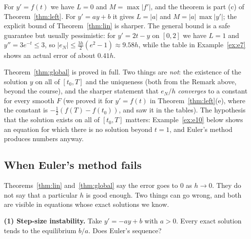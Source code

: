 \documentclass[11pt]{article}
\begin{document}
For $y'=f(t)$ we have $L=0$ and $M=\max\lvert f'\rvert$, and the theorem is part (c) of Theorem~\ref{thm:left}. For $y'=ay+b$ it gives $L=\lvert a\rvert$ and $M=\lvert a\rvert\,\max\lvert y'\rvert$; the explicit bound of Theorem~\ref{thm:lin} is sharper. The general bound is a safe guarantee but usually pessimistic: for $y'=2t-y$ on $[0,2]$ we have $L=1$ and $y''=3e^{-t}\le3$, so $\lvert e_N\rvert\le\frac{3h}{2}(e^{2}-1)\approx9.58h$, while the table in Example~\ref{ex:e7} shows an actual error of about $0.41h$.

\begin{remark}
Theorem~\ref{thm:global} is proved in full. Two things are \emph{not}: the existence of the solution $y$ on all of $[t_0,T]$ and the uniqueness (both from the Remark above, beyond the course), and the sharper statement that $e_N/h$ \emph{converges} to a constant for every smooth $F$ (we proved it for $y'=f(t)$ in Theorem~\ref{thm:left}(e), where the constant is $-\frac12(f(T)-f(t_0))$, and saw it in the tables). The hypothesis that the solution exists on all of $[t_0,T]$ matters: Example~\ref{ex:e10} below shows an equation for which there is no solution beyond $t=1$, and Euler's method produces numbers anyway.
\end{remark}

\subsection*{When Euler's method fails}

Theorems~\ref{thm:lin} and~\ref{thm:global} say the error goes to $0$ as $h\to0$. They do not say that a particular $h$ is good enough. Two things can go wrong, and both are visible in equations whose exact solutions we know.

\textbf{(1) Step-size instability.} Take $y'=-ay+b$ with $a>0$. Every exact solution tends to the equilibrium $b/a$. Does Euler's sequence?
\end{document}
